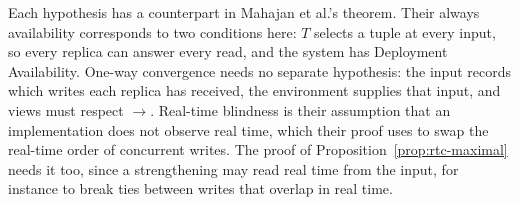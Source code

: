 Each hypothesis has a counterpart in Mahajan et al.'s theorem.  Their always
availability corresponds to two conditions here: $T$ selects a tuple at every
input, so every replica can answer every read, and the system has Deployment
Availability.  One-way convergence needs no separate hypothesis: the input
records which writes each replica has received, the environment supplies that
input, and views must respect $\to$.  Real-time blindness is their assumption
that an implementation does not observe real time, which their proof uses to
swap the real-time order of concurrent writes.  The proof of
Proposition~\ref{prop:rtc-maximal} needs it too, since a strengthening may read
real time from the input, for instance to break ties between writes that
overlap in real time.
